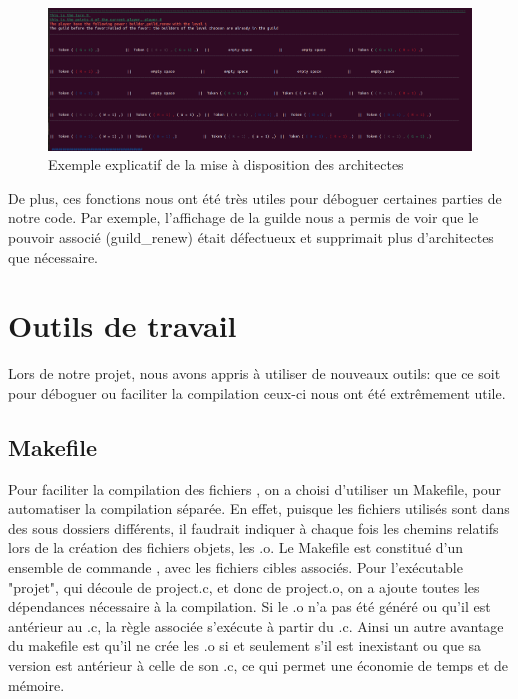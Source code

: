 \documentclass{article}
\begin{document}
        \begin{figure}[!ht]
            \centering
            \includegraphics[width=1\linewidth]{Capture d’écran du 2024-01-12 15-39-21.png}
            \caption{Exemple explicatif de la mise à disposition des architectes}
            \label{display}
        \end{figure}

        
        \vspace{1em} De plus, ces fonctions nous ont été très utiles pour déboguer certaines parties de notre code. Par exemple, l'affichage de la guilde nous a permis de voir que le pouvoir associé (guild\_renew) était défectueux et supprimait plus d'architectes que nécessaire.
        
\section{Outils de travail}

    Lors de notre projet, nous avons appris à utiliser de nouveaux outils: que ce soit pour déboguer ou faciliter la compilation ceux-ci nous ont été extrêmement utile.
    
    \subsection{Makefile} %
    \hspace{1em} Pour faciliter la compilation des fichiers , on a choisi d'utiliser un Makefile, pour automatiser la compilation séparée. En effet, puisque les fichiers utilisés sont dans des sous dossiers différents, il faudrait indiquer à chaque fois les chemins relatifs lors de la création des fichiers objets, les .o. Le Makefile est constitué d'un ensemble de commande , avec les fichiers cibles associés. Pour l'exécutable "projet", qui découle de project.c, et donc de project.o, on a ajoute toutes les dépendances nécessaire à la compilation. Si le .o n'a pas été généré ou qu'il est antérieur au .c, la règle associée s'exécute à partir du .c. Ainsi un autre  avantage du makefile est qu'il ne crée les .o si et seulement s'il est inexistant ou que sa version est antérieur à celle de son .c, ce qui permet une économie de temps et de mémoire. 
\end{document}
